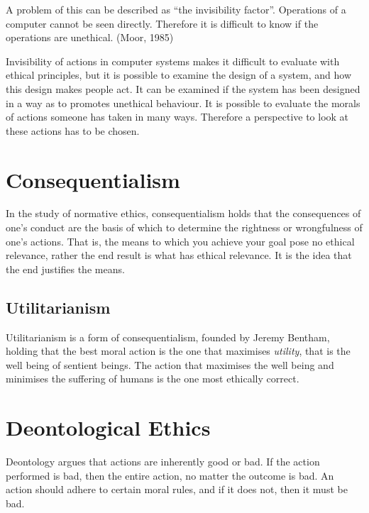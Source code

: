 A problem of this can be described as “the invisibility factor”. Operations of a computer cannot be seen directly. Therefore it is difficult to know if the operations are unethical. (Moor, 1985)

Invisibility of actions in computer systems makes it difficult to evaluate with ethical principles, but it is possible to examine the design of a system, and how this design makes people act. It can be examined if the system has been designed in a way as to promotes unethical behaviour. It is possible to evaluate the morals of actions someone has taken in many ways. Therefore a perspective to look at these actions has to be chosen.

\section{Consequentialism}
In the study of normative ethics, consequentialism holds that the consequences of one's conduct are the basis of which to determine the rightness or wrongfulness of one's actions. That is, the means to which you achieve your goal pose no ethical relevance, rather the end result is what has ethical relevance. It is the idea that the end justifies the means. \cite{mizzoni2009ethics}


\subsection{Utilitarianism}
Utilitarianism is a form of consequentialism, founded by Jeremy Bentham, holding that the best moral action is the one that maximises \textit{utility}, that is the well being of sentient beings. The action that maximises the well being and minimises the suffering of humans is the one most ethically correct.



\section{Deontological Ethics}
Deontology argues that actions are inherently good or bad. If the action performed is bad, then the entire action, no matter the outcome is bad. An action should adhere to certain moral rules, and if it does not, then it must be bad. 

